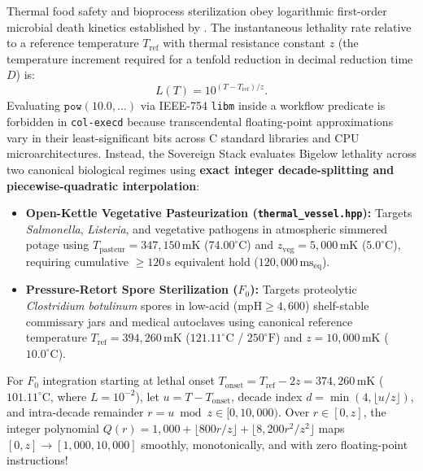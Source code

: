 Thermal food safety and bioprocess sterilization obey logarithmic first-order microbial death
kinetics established by \textcite{bigelow1921thermal}. The instantaneous lethality rate relative
to a reference temperature $T_{\mathrm{ref}}$ with thermal resistance constant $z$ (the
temperature increment required for a tenfold reduction in decimal reduction time $D$) is:
\begin{equation}
\label{eq:bigelow-exact}
L(T) = 10^{(T - T_{\mathrm{ref}}) / z}.
\end{equation}
Evaluating $\texttt{pow}(10.0, \dots)$ via IEEE-754 \texttt{libm} inside a workflow predicate
is forbidden in \texttt{col-execd} because transcendental floating-point approximations vary in
their least-significant bits across C standard libraries and CPU microarchitectures. Instead,
the Sovereign Stack evaluates Bigelow lethality across two canonical biological regimes using
\textbf{exact integer decade-splitting and piecewise-quadratic interpolation}:

\begin{itemize}
    \item \textbf{Open-Kettle Vegetative Pasteurization (\texttt{thermal\_vessel.hpp}):} Targets
    \emph{Salmonella}, \emph{Listeria}, and vegetative pathogens in atmospheric simmered potage
    using $T_{\mathrm{pasteur}} = 347{,}150\,\mathrm{mK}$ ($74.00^\circ\mathrm{C}$) and
    $z_{\mathrm{veg}} = 5{,}000\,\mathrm{mK}$ ($5.0^\circ\mathrm{C}$), requiring cumulative
    $\ge 120\,\mathrm{s}$ equivalent hold ($120{,}000\,\mathrm{ms}_{\mathrm{eq}}$).
    \item \textbf{Pressure-Retort Spore Sterilization ($F_0$):} Targets proteolytic
    \emph{Clostridium botulinum} spores in low-acid ($\mathrm{mpH} \ge 4{,}600$) shelf-stable
    commissary jars and medical autoclaves using canonical reference temperature
    $T_{\mathrm{ref}} = 394{,}260\,\mathrm{mK}$ ($121.11^\circ\mathrm{C}$ / $250^\circ\mathrm{F}$)
    and $z = 10{,}000\,\mathrm{mK}$ ($10.0^\circ\mathrm{C}$).
\end{itemize}

For $F_0$ integration starting at lethal onset $T_{\mathrm{onset}} = T_{\mathrm{ref}} - 2z =
374{,}260\,\mathrm{mK}$ ($101.11^\circ\mathrm{C}$, where $L = 10^{-2}$), let $u = T -
T_{\mathrm{onset}}$, decade index $d = \min(4, \lfloor u / z \rfloor)$, and intra-decade
remainder $r = u \bmod z \in [0, 10{,}000)$. Over $r \in [0, z]$, the integer polynomial
$Q(r) = 1{,}000 + \lfloor 800 r / z \rfloor + \lfloor 8{,}200 r^2 / z^2 \rfloor$ maps $[0, z]
\to [1{,}000, 10{,}000]$ smoothly, monotonically, and with zero floating-point instructions!

